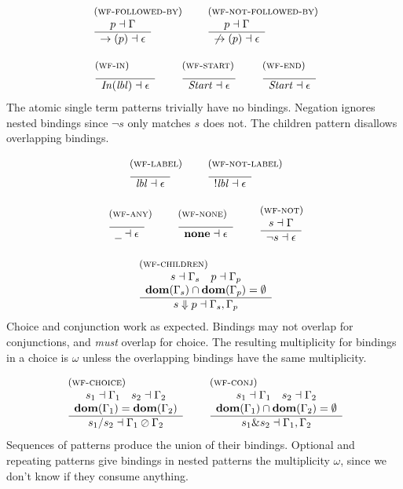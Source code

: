 \documentclass{article}
\newcommand{\rulename}{\textsc}
\newcommand{\irule}[3]{\begin{array}{l}{~\small\mbox{(\rulename{#1})}}\\\;\frac{\begin{array}{c}#2\end{array}}{\begin{array}{l}#3\end{array}}\end{array}}
\newcommand{\lbl}{\ensuremath{\mathit{lbl}}}
\newcommand{\por}[2]{\ensuremath{#1/#2}}
\newcommand{\pand}[2]{\ensuremath{#1\&#2}}
\newcommand{\children}[2]{\ensuremath{#1} \Downarrow #2}
\newcommand{\pnot}[1]{\ensuremath{\lnot #1}}
\newcommand{\any}{\ensuremath{\text{\underline{\hspace{0.6em}}}}}
\newcommand{\none}{\ensuremath{\mathbf{none}}}
\newcommand{\fb}[1]{\ensuremath{\rightarrow(#1)}}
\newcommand{\nfb}[1]{\ensuremath{\not\rightarrow(#1)}}
\newcommand{\pin}[1]{\ensuremath{\mathit{In}(#1)}}
\newcommand{\pstart}{\ensuremath{\mathit{Start}}}
\begin{document}
\[
  \begin{array}{c}
    \irule{wf-followed-by}{
    p \dashv \Gamma
    }{
    \fb{p} \dashv \epsilon
    }
    \quad
    \irule{wf-not-followed-by}{
    p \dashv \Gamma
    }{
    \nfb{p} \dashv \epsilon
    }
    \\\\
    \irule{wf-in}{
    }{
    \pin{\lbl} \dashv \epsilon
    }
    \quad
    \irule{wf-start}{
    }{
    \pstart \dashv \epsilon
    }
    \quad
    \irule{wf-end}{
    }{
    \pstart \dashv \epsilon
    }
  \end{array}
\]
%
The atomic single term patterns trivially have no bindings.
Negation ignores nested bindings since \pnot{s} only matches $s$
does not.
%
The children pattern disallows overlapping bindings.

\[
  \begin{array}{c}
    \irule{wf-label}{
    }{
    \lbl \dashv \epsilon
    }
    \quad
    \irule{wf-not-label}{
    }{
    !\lbl \dashv \epsilon
    }
    \\\\
    \irule{wf-any}{
    }{
    \any \dashv \epsilon
    }
    \quad
    \irule{wf-none}{
    }{
    \none \dashv \epsilon
    }
    \quad
    \irule{wf-not}{
    s \dashv \Gamma
    }{
    \pnot{s} \dashv \epsilon
    }
    \\\\
    \irule{wf-children}{
    s \dashv \Gamma_s\quad
    p \dashv \Gamma_p\\
    \mathbf{dom}(\Gamma_s) \cap \mathbf{dom}(\Gamma_p) = \emptyset
    }{
    \children{s}{p} \dashv \Gamma_s, \Gamma_p
    }
  \end{array}
\]
%
Choice and conjunction work as expected. Bindings may not overlap
for conjunctions, and \emph{must} overlap for choice. The
resulting multiplicity for bindings in a choice is $\omega$ unless
the overlapping bindings have the same multiplicity.

\[
  \begin{array}{c}
    \irule{wf-choice}{
    s_1 \dashv \Gamma_1\quad
    s_2 \dashv \Gamma_2\\
    \mathbf{dom}(\Gamma_1) = \mathbf{dom}(\Gamma_2)
    }{
    \por{s_1}{s_2} \dashv \Gamma_1 \oslash \Gamma_2
    }
    \quad
    \irule{wf-conj}{
    s_1 \dashv \Gamma_1\quad
    s_2 \dashv \Gamma_2\\
    \mathbf{dom}(\Gamma_1) \cap \mathbf{dom}(\Gamma_2) = \emptyset
    }{
    \pand{s_1}{s_2} \dashv \Gamma_1, \Gamma_2
    }
  \end{array}
\]
%
Sequences of patterns produce the union of their bindings.
Optional and repeating patterns give bindings in nested patterns
the multiplicity $\omega$, since we don't know if they consume
anything.
\end{document}
